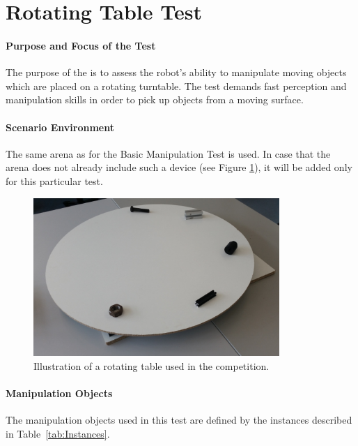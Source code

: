 \newpage
\section{Rotating Table Test}
\label{sec:Rotating Table Test}

\paragraph{Purpose and Focus of the Test}
The purpose of the  is to assess the robot's ability to manipulate moving objects which are placed on a rotating turntable. The test demands fast perception and manipulation skills in order to pick up objects from a moving surface.

\paragraph{Scenario Environment}
The same arena as for the Basic Manipulation Test is used. In case that the arena does not already include such a device (see Figure \ref{fig:conveyor_belt}), it will be added only for this particular test.

\begin{figure} [h!]
	\begin{center}
		\includegraphics[height = 6cm]{./images/rotating_table.jpg}
	\end{center}
	\caption{Illustration of a rotating table used in the competition.}
	\label{fig:conveyor_belt}
\end{figure}



\paragraph{Manipulation Objects}
The manipulation objects used in this test are defined by the instances described in Table~\ref{tab:Instances}.

